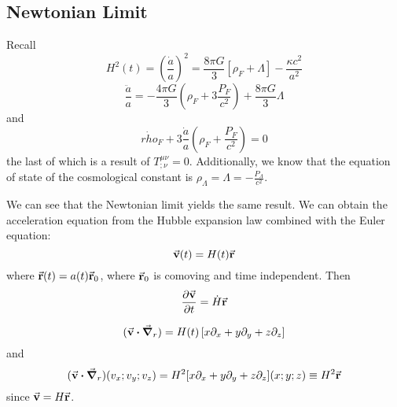 \documentclass[a4paper,twoside,master.tex]{subfiles}
\begin{document}
\subsection{Newtonian Limit}\label{sub:newtonian_limit}

Recall
\begin{equation}
    H^2(t) = \left( \frac{\dot{a}}{a} \right)^2 = \frac{8 \pi G}{3} \left[ \rho_F + \Lambda \right] - \frac{\kappa c^2}{a^2} \tag{Friedmann Equation}
\end{equation}
\begin{equation}
    \frac{\ddot{a}}{a} = - \frac{4 \pi G}{3} \left( \rho_F + 3 \frac{P_F}{c^2} \right) + \frac{8 \pi G}{3} \Lambda \tag{Acceleration Equation}
\end{equation}
and
\begin{equation}
    \dot{rho}_F + 3 \frac{\dot{a}}{a} \left( \rho_F + \frac{P_F}{c^2} \right) = 0 \tag{Covariant Conservation}
\end{equation}
the last of which is a result of $ T^{\mu \nu}_{; \nu} = 0 $. Additionally, we know that the equation of state of the cosmological constant is $ \rho_{\Lambda} = \Lambda = - \frac{P_{\Lambda}}{c^2} $.

We can see that the Newtonian limit yields the same result. We can obtain the acceleration equation from the Hubble expansion law combined with the Euler equation:
\begin{equation}
    \va{v}(t) = H(t) \va{r}
\end{equation}
where $ \va{r}(t) = a(t) \va{r}_0 $, where $ \va{r}_0 $ is comoving and time independent. Then
\begin{equation}
    \pdv{\va{v}}{t} = \dot{H} \va{r}
\end{equation}

\begin{equation}
    (\va{v} \vdot \grad_r) = H(t) \left[ x \partial_x + y \partial_y + z \partial_z \right]
\end{equation}
and
\begin{equation}
    (\va{v} \vdot \grad_r)(v_x; v_y; v_z) = H^2 [x \partial_x + y \partial_y + z \partial_z] (x;y;z) \equiv H^2 \va{r}
\end{equation}
since $ \va{v} = H \va{r} $.
\end{document}
